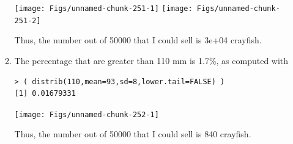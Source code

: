 \documentclass[10pt,openany]{book}\usepackage[]{graphicx}\usepackage[]{color}
\makeatletter
\newenvironment{kframe}{%
 \def\at@end@of@kframe{}%
 \ifinner\ifhmode%
  \def\at@end@of@kframe{\end{minipage}}%
  \begin{minipage}{\columnwidth}%
 \fi\fi%
 \def\FrameCommand##1{\hskip\@totalleftmargin \hskip-\fboxsep
 \colorbox{shadecolor}{##1}\hskip-\fboxsep
     \hskip-\linewidth \hskip-\@totalleftmargin \hskip\columnwidth}%
 \MakeFramed {\advance\hsize-\width
   \@totalleftmargin\z@ \linewidth\hsize
   \@setminipage}}%
 {\par\unskip\endMakeFramed%
 \at@end@of@kframe}
\newenvironment{knitrout}{}{} %
\makeatother
\begin{document}
\begin{itemize}
\begin{enumerate}
\begin{knitrout}
{\centering \texttt{[image: Figs/unnamed-chunk-251-1]} 
\texttt{[image: Figs/unnamed-chunk-251-2]} 

}



\end{knitrout}
Thus, the number out of 50000 that I could sell is 3e+04 crayfish.
      \item The percentage that are greater than 110 mm is 1.7\%, as computed with
\begin{knitrout}
\color{fgcolor}\begin{kframe}
\begin{verbatim}
> ( distrib(110,mean=93,sd=8,lower.tail=FALSE) )
[1] 0.01679331
\end{verbatim}
\end{kframe}

{\centering \texttt{[image: Figs/unnamed-chunk-252-1]} 

}



\end{knitrout}
Thus, the number out of 50000 that I could sell is 840 crayfish.
    \end{enumerate}

\end{itemize}




\end{document}
